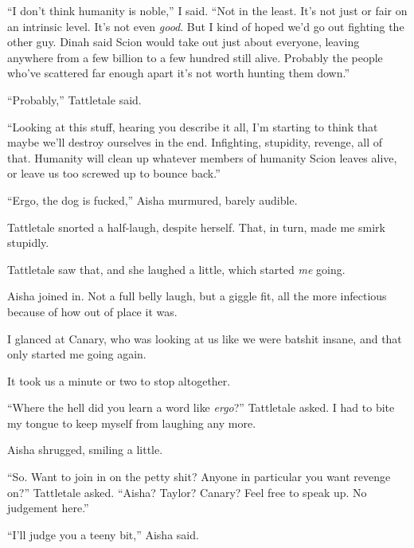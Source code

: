 ``I don't think humanity is noble,'' I said.  ``Not in the least.  It's not just or fair on an intrinsic level.  It's not even \emph{good}.  But I kind of hoped we'd go out fighting the other guy.  Dinah said Scion would take out just about everyone, leaving anywhere from a few billion to a few hundred still alive.  Probably the people who've scattered far enough apart it's not worth hunting them down.''



``Probably,'' Tattletale said.



``Looking at this stuff, hearing you describe it all, I'm starting to think that maybe we'll destroy ourselves in the end.  Infighting, stupidity, revenge, all of that.  Humanity will clean up whatever members of humanity Scion leaves alive, or leave us too screwed up to bounce back.''



``Ergo, the dog is fucked,'' Aisha murmured, barely audible.



Tattletale snorted a half-laugh, despite herself.  That, in turn, made me smirk stupidly.



Tattletale saw that, and she laughed a little, which started \emph{me} going.



Aisha joined in.  Not a full belly laugh, but a giggle fit, all the more infectious because of how out of place it was.



I glanced at Canary, who was looking at us like we were batshit insane, and that only started me going again.



It took us a minute or two to stop altogether.



``Where the hell did you learn a word like \emph{ergo}?''  Tattletale asked.  I had to bite my tongue to keep myself from laughing any more.



Aisha shrugged, smiling a little.



``So.  Want to join in on the petty shit?  Anyone in particular you want revenge on?''  Tattletale asked.  ``Aisha?  Taylor?  Canary?  Feel free to speak up.  No judgement here.''



``I'll judge you a teeny bit,'' Aisha said.



